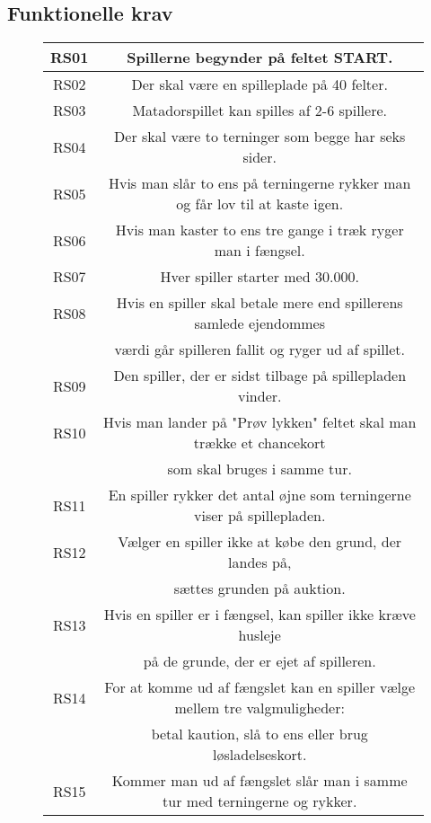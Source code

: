 \begin{flushleft}
\subsection{Funktionelle krav}
\end{flushleft}
\begin{figure}[H]
    \centering
\begin{tabular}{ | c | c | } 
\hline
RS01 & Spillerne begynder på feltet START. \\ 
\hline
RS02 & Der skal være en spilleplade på 40 felter. \\ 
\hline
RS03 & Matadorspillet kan spilles af 2-6 spillere. \\ 
\hline
RS04 & Der skal være to terninger som begge har seks sider. \\ 
\hline
RS05 & Hvis man slår to ens på terningerne rykker man og får lov til at kaste igen. \\
\hline
RS06 & Hvis man kaster to ens tre gange i træk ryger man i fængsel. \\ 
\hline
RS07 & Hver spiller starter med 30.000. \\ 
\hline
RS08 & Hvis en spiller skal betale mere end spillerens samlede ejendommes\\ & værdi går spilleren fallit og ryger ud af spillet. \\ 
\hline
RS09 & Den spiller, der er sidst tilbage på spillepladen vinder. \\ 
\hline
RS10 & Hvis man lander på "Prøv lykken" feltet skal man trække et chancekort\\
& som skal bruges i samme tur. \\ 
\hline
RS11 & En spiller rykker det antal øjne som terningerne viser på spillepladen.\\ 
\hline
RS12 & Vælger en spiller ikke at købe den grund, der landes på, \\
& sættes grunden på auktion.\\ 
\hline
RS13 & Hvis en spiller er i fængsel, kan spiller ikke kræve husleje\\
& på de grunde, der er ejet af spilleren.\\
\hline
RS14 & For at komme ud af fængslet kan en spiller vælge mellem tre valgmuligheder:\\
& betal kaution, slå to ens eller brug løsladelseskort. \\ 
\hline
RS15 & Kommer man ud af fængslet slår man  i samme tur med terningerne og rykker. \\ 

\end{tabular}
\end{figure}
